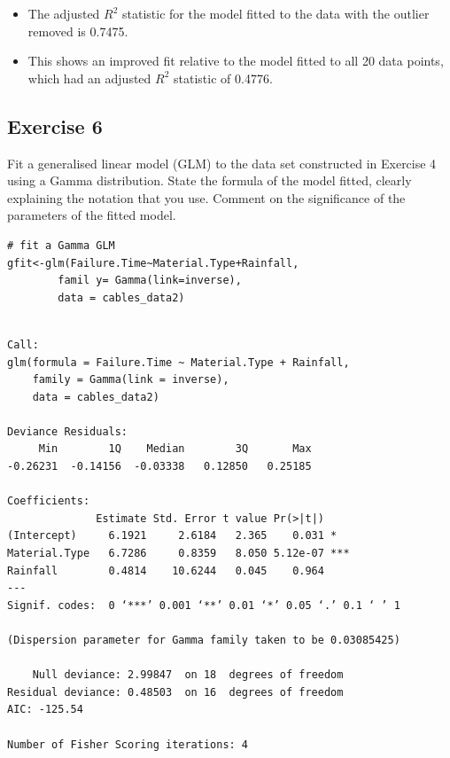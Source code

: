 \documentclass[a4paper,12pt]{article}
\begin{document}
\begin{itemize}
    \item The adjusted $R^2$ statistic for the model fitted to the data with the outlier
removed is 0.7475. 
\item This shows an improved fit relative to the model fitted to all
20 data points, which had an adjusted $R^2$ statistic of 0.4776.
\end{itemize}



\newpage 
\subsection*{Exercise 6}
\noindent Fit a generalised linear model (GLM) to the data set constructed in
Exercise 4 using a Gamma distribution.
State the formula of the model fitted, clearly explaining
the notation that you use.
Comment on the significance of the parameters of the fitted model.


\begin{framed}\begin{verbatim}
# fit a Gamma GLM
gfit<-glm(Failure.Time~Material.Type+Rainfall,
        famil y= Gamma(link=inverse), 
        data = cables_data2)
\end{verbatim} \end{framed}

\newpage
\begin{verbatim}

Call:
glm(formula = Failure.Time ~ Material.Type + Rainfall,
    family = Gamma(link = inverse), 
    data = cables_data2)

Deviance Residuals: 
     Min        1Q    Median        3Q       Max  
-0.26231  -0.14156  -0.03338   0.12850   0.25185  

Coefficients:
              Estimate Std. Error t value Pr(>|t|)    
(Intercept)     6.1921     2.6184   2.365    0.031 *  
Material.Type   6.7286     0.8359   8.050 5.12e-07 ***
Rainfall        0.4814    10.6244   0.045    0.964    
---
Signif. codes:  0 ‘***’ 0.001 ‘**’ 0.01 ‘*’ 0.05 ‘.’ 0.1 ‘ ’ 1

(Dispersion parameter for Gamma family taken to be 0.03085425)

    Null deviance: 2.99847  on 18  degrees of freedom
Residual deviance: 0.48503  on 16  degrees of freedom
AIC: -125.54

Number of Fisher Scoring iterations: 4

\end{verbatim}
\newpage 
\end{document}
